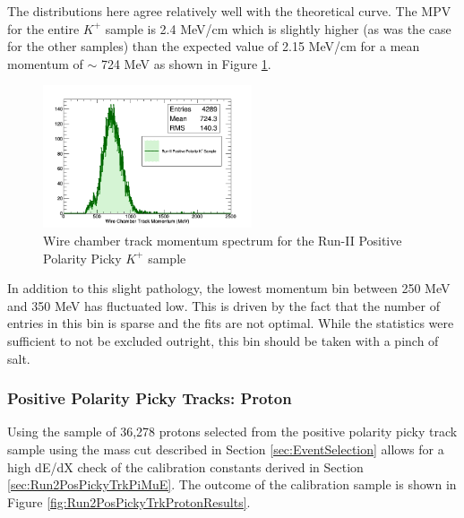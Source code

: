 The distributions here agree relatively well with the theoretical curve. The MPV for the entire $K^{+}$ sample is 2.4 MeV/cm which is slightly higher (as was the case for the other samples) than the expected value of 2.15 MeV/cm for a mean momentum of $\sim$ 724 MeV as shown in Figure \ref{fig:Run2PosPickyTrkKaonMomentumSpec}. 


\begin{figure}[htb]
\centering
\includegraphics[width=0.55\textwidth]{images/RunIIKaonPosPolWCMomentum.png}
\caption{Wire chamber track momentum spectrum for the Run-II Positive Polarity Picky $K^{+}$ sample  }
\label{fig:Run2PosPickyTrkKaonMomentumSpec}
\end{figure}


In addition to this slight pathology, the lowest momentum bin between 250 MeV and 350 MeV has fluctuated low. This is driven by the fact that the number of entries in this bin is sparse and the fits are not optimal. While the statistics were sufficient to not be excluded outright, this bin should be taken with a pinch of salt.

\subsubsection{Positive Polarity Picky Tracks: Proton}\label{sec:Run2PosPickyTrkProton}

Using the sample of 36,278 protons selected from the positive polarity picky track sample using the mass cut described in Section \ref{sec:EventSelection} allows for a high dE/dX check of the calibration constants derived in Section \ref{sec:Run2PosPickyTrkPiMuE}. The outcome of the calibration sample is shown in Figure \ref{fig:Run2PosPickyTrkProtonResults}.

